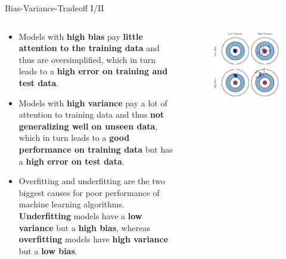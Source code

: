 \documentclass[main.tex]{subfiles}
\begin{document}
    \begin{frame}{Bias-Variance-Tradeoff I/II}
        \begin{columns}
            \begin{column}{0.6\textwidth}
                \begin{itemize}	
                    \item Models with \textbf{high bias} pay \textbf{little attention to the training data} and thus are oversimplified, which in turn leads to a \textbf{high error on training and test data}.
                    \item Models with \textbf{high variance} pay a lot of attention to training data and thus \textbf{not generalizing well on unseen data}, which in turn leads to a \textbf{good performance on training data} but has a \textbf{high error on test data}.
                    \item Overfitting and underfitting are the two biggest causes for poor performance of machine learning algorithms. \textbf{Underfitting} models have a \textbf{low variance} but a \textbf{high bias}, whereas \textbf{overfitting} models have \textbf{high variance} but a \textbf{low bias}. 
                \end{itemize}
            \end{column}
            \begin{column}{0.4\textwidth}
                \begin{figure}
                    \label{fig:bias-variance-tradeoff-1}
                    \includegraphics[width=\textwidth, keepaspectratio]{figures/external/bias-variance-tradeoff-1.png}
                \end{figure}
            \end{column}
        \end{columns}
    \end{frame}
\end{document}
